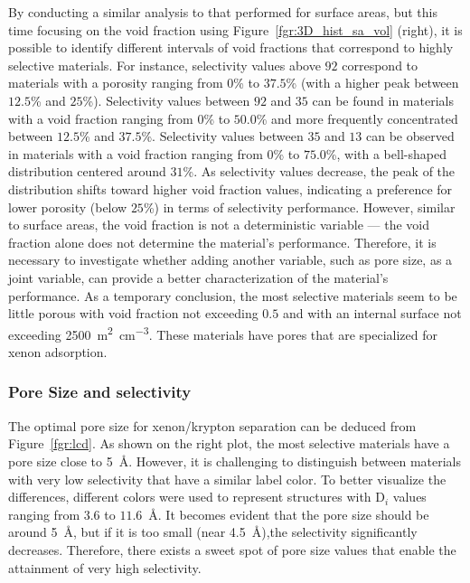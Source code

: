 \documentclass[main.tex]{subfiles}
\begin{document}
By conducting a similar analysis to that performed for surface areas, but this time focusing on the void fraction using Figure~\ref{fgr:3D_hist_sa_vol} (right), it is possible to identify different intervals of void fractions that correspond to highly selective materials. For instance, selectivity values above $92$ correspond to materials with a porosity ranging from {$0$\%} to {$37.5$\%} (with a higher peak between {$12.5$\%} and {$25$\%}). Selectivity values between $92$ and $35$ can be found in materials with a void fraction ranging from {$0$\%} to {$50.0$\%} and more frequently concentrated between {$12.5$\%} and {$37.5$\%}. Selectivity values between $35$ and $13$ can be observed in materials with a void fraction ranging from {$0$\%} to {$75.0$\%}, with a bell-shaped distribution centered around {$31$\%}. As selectivity values decrease, the peak of the distribution shifts toward higher void fraction values, indicating a preference for lower porosity (below {$25$\%}) in terms of selectivity performance. However, similar to surface areas, the void fraction is not a deterministic variable — the void fraction alone does not determine the material's performance. Therefore, it is necessary to investigate whether adding another variable, such as pore size, as a joint variable, can provide a better characterization of the material's performance. As a temporary conclusion, the most selective materials seem to be little porous with void fraction not exceeding $0.5$ and with an internal surface not exceeding \SI{2500}{\square\m\per\cubic\cm}. These materials have pores that are specialized for xenon adsorption. 

\subsubsection{Pore Size and selectivity}

The optimal pore size for xenon/krypton separation can be deduced from Figure~\ref{fgr:lcd}. As shown on the right plot, the most selective materials have a pore size close to \SI{5}{\angstrom}. However, it is challenging to distinguish between materials with very low selectivity that have a similar label color. To better visualize the differences, different colors were used to represent structures with D$_i$ values ranging from $3.6$ to $11.6$~\si{\angstrom}. It becomes evident that the pore size should be around \SI{5}{\angstrom}, but if it is too small (near \SI{4.5}{\angstrom}),the selectivity significantly decreases. Therefore, there exists a sweet spot of pore size values that enable the attainment of very high selectivity.
\end{document}
